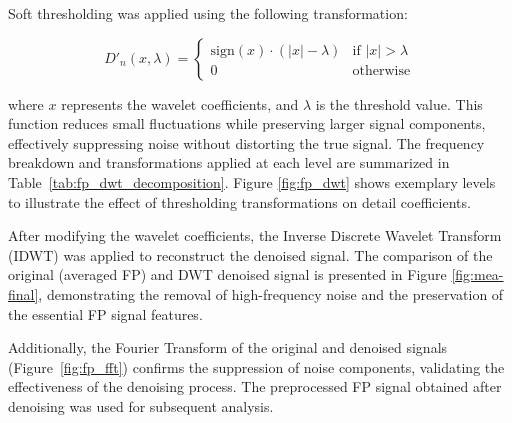 \documentclass{report}
\begin{document}
            Soft thresholding was applied using the following transformation:
            
            \[
            D'_n(x, \lambda)  = 
            \begin{cases} 
            \text{sign}(x) \cdot (\lvert x \rvert - \lambda) & \text{if } \lvert x \rvert > \lambda \\
            0 & \text{otherwise}
            \end{cases}
            \]
            
            where \( x \) represents the wavelet coefficients, and \( \lambda \) is the threshold value. This function reduces small fluctuations while preserving larger signal components, effectively suppressing noise without distorting the true signal. The frequency breakdown and transformations applied at each level are summarized in Table~\ref{tab:fp_dwt_decomposition}.  Figure \ref{fig:fp_dwt} shows exemplary levels to illustrate the effect of thresholding transformations on detail coefficients.
            
            After modifying the wavelet coefficients, the Inverse Discrete Wavelet Transform (IDWT) was applied to reconstruct the denoised signal. The comparison of the original (averaged FP) and DWT denoised signal is presented in Figure \ref{fig:mea-final}, demonstrating the removal of high-frequency noise and the preservation of the essential FP signal features. 
            
            Additionally, the Fourier Transform of the original and denoised signals (Figure~\ref{fig:fp_fft}) confirms the suppression of noise components, validating the effectiveness of the denoising process. The preprocessed FP signal obtained after denoising was used for subsequent analysis.


\end{document}
